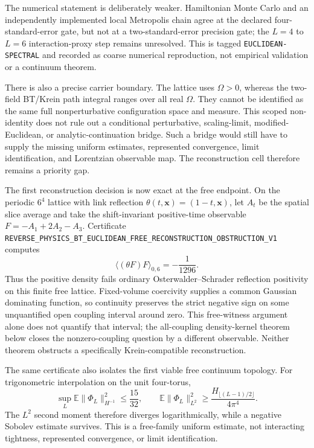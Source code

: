 \documentclass[11pt]{article}
\theoremstyle{definition}
\theoremstyle{remark}
\newcommand{\cert}[1]{\nolinkurl{#1}}
\newcommand{\rtype}[1]{\nolinkurl{#1}}
\begin{document}
The numerical statement is deliberately weaker.  Hamiltonian Monte Carlo and
an independently implemented local Metropolis chain agree at the declared
four-standard-error gate, but not at a two-standard-error precision gate; the
$L=4$ to $L=6$ interaction-proxy step remains unresolved.  This is tagged
\rtype{EUCLIDEAN-SPECTRAL} and recorded as coarse numerical reproduction, not
empirical validation or a continuum theorem.

There is also a precise carrier boundary.  The lattice uses $\Omega>0$,
whereas the two-field BT/Krein path integral ranges over all real $\Omega$.
They cannot be identified as the same full nonperturbative configuration space
and measure.  This scoped non-identity does not rule out a conditional
perturbative, scaling-limit, modified-Euclidean, or analytic-continuation
bridge.  Such a bridge would still have to supply the missing uniform
estimates, represented convergence, limit identification, and Lorentzian
observable map.  The reconstruction cell therefore remains a priority gap.

The first reconstruction decision is now exact at the free endpoint.  On the
periodic \(6^4\) lattice with link reflection
\(\theta(t,\mathbf x)=(1-t,\mathbf x)\), let \(A_t\) be the spatial slice
average and take the shift-invariant positive-time observable
\(F=-A_1+2A_2-A_3\).  Certificate
\cert{REVERSE_PHYSICS_BT_EUCLIDEAN_FREE_RECONSTRUCTION_OBSTRUCTION_V1}
computes
\[
                 \langle(\theta F)F\rangle_{0,6}=-\frac1{1296}.
\]
Thus the positive density fails ordinary Osterwalder--Schrader reflection
positivity on this finite free lattice.  Fixed-volume coercivity supplies a
common Gaussian dominating function, so continuity preserves the strict
negative sign on some unquantified open coupling interval around zero.  This
free-witness argument alone does not quantify that interval; the all-coupling
density-kernel theorem below closes the nonzero-coupling question by a
different observable.  Neither theorem obstructs a specifically
Krein-compatible reconstruction.

The same certificate also isolates the first viable free continuum topology.
For trigonometric interpolation on the unit four-torus,
\[
 \sup_L\mathbb E\|\Phi_L\|_{H^{-1}}^2\leq\frac{15}{32},
 \qquad
 \mathbb E\|\Phi_L\|_{L^2}^2
 \geq\frac{H_{\lfloor(L-1)/2\rfloor}}{4\pi^4}.
\]
The \(L^2\) second moment therefore diverges logarithmically, while a negative
Sobolev estimate survives.  This is a free-family uniform estimate, not
interacting tightness, represented convergence, or limit identification.
\end{document}
